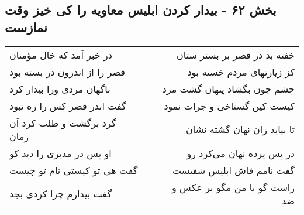 \begin{center}
\section*{بخش ۶۲ - بیدار کردن ابلیس معاویه را  کی خیز وقت نمازست}
\label{sec:sh062}
\begin{longtable}{l p{0.5cm} r}
در خبر آمد که خال مؤمنان
&&
خفته بد در قصر بر بستر ستان
\\
قصر را از اندرون در بسته بود
&&
کز زیارتهای مردم خسته بود
\\
ناگهان مردی ورا بیدار کرد
&&
چشم چون بگشاد پنهان گشت مرد
\\
گفت اندر قصر کس را ره نبود
&&
کیست کین گستاخی و جرات نمود
\\
گرد برگشت و طلب کرد آن زمان
&&
تا بیاید زان نهان گشته نشان
\\
او پس در مدبری را دید کو
&&
در پس پرده نهان می‌کرد رو
\\
گفت هی تو کیستی نام تو چیست
&&
گفت نامم فاش ابلیس شقیست
\\
گفت بیدارم چرا کردی بجد
&&
راست گو با من مگو بر عکس و ضد
\\
\end{longtable}
\end{center}

